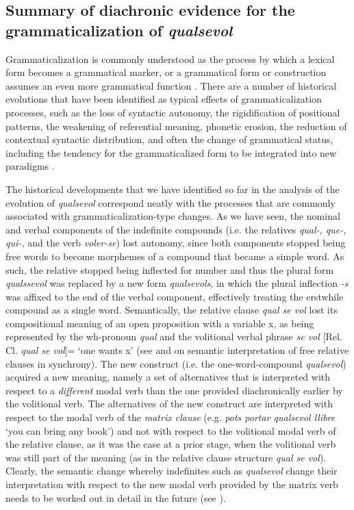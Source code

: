 \documentclass[output=paper,colorlinks,citecolor=brown]{langscibook}
\begin{document}
\subsection{Summary of diachronic evidence for the grammaticalization of \textit{qualsevol}}\label{sec:kea6.1}

Grammaticalization is commonly understood as the process by which a lexical form becomes a grammatical marker, or a grammatical form or construction assumes an even more grammatical function \citep[cf.][]{Kurylowicz1965, Lehmann1982, HopperTraugott2003}. There are a number of historical evolutions that have been identified as typical effects of grammaticalization processes, such as the loss of syntactic autonomy, the rigidification of positional patterns, the weakening of referential meaning, phonetic erosion, the reduction of contextual syntactic distribution, and often the change of grammatical status, including the tendency for the grammaticalized form to be integrated into new paradigms \citep{Lehmann1985, CompanyCompany2009}.

The historical developments that we have identified so far in the analysis of the evolution of \textit{qualsevol} correspond neatly with the processes that are commonly associated with grammaticalization-type changes. As we have seen, the nominal and verbal components of the indefinite compounds (i.e. the relatives \textit{qual-, que-, qui-,} and the verb \textit{voler-se}) lost autonomy, since both components stopped being free words to become morphemes of a compound that became a simple word. As such, the relative stopped being inflected for number and thus the plural form \textit{qualssevol} was replaced by a new form \textit{qualsevols}, in which the plural inflection \textit{-s} was affixed to the end of the verbal component, effectively treating the erstwhile compound as a single word.  Semantically, the relative clause \textit{qual se vol} lost its compositional meaning of an open proposition with a variable x, as being represented by the wh-pronoun \textit{qual} and the volitional verbal phrase \textit{se vol} [Rel. Cl. \textit{qual se vol}]= ‘one wants x’ (see \cite{Caponigro2004} and \cite{Kellert2015} on semantic interpretation of free relative clauses in synchrony). The new construct (i.e. the one-word-compound \textit{qualsevol}) acquired a new meaning, namely a set of alternatives that is interpreted with respect to a \textit{different} modal verb than the one provided diachronically earlier by the volitional verb. The alternatives of the new construct are interpreted with respect to the modal verb of the \textit{matrix clause} (e.g. \textit{pots portar qualsevol llibre} ‘you can bring any book’) and not with respect to the volitional modal verb of the relative clause, as it was the case at a prior stage, when the volitional verb was still part of the meaning (as in the relative clause structure \textit{qual se vol}). Clearly, the semantic change whereby indefinites such as \textit{qualsevol} change their interpretation with respect to the new modal verb provided by the matrix verb needs to be worked out in detail in the future (see \cite{Kellert2021c}).
\end{document}
